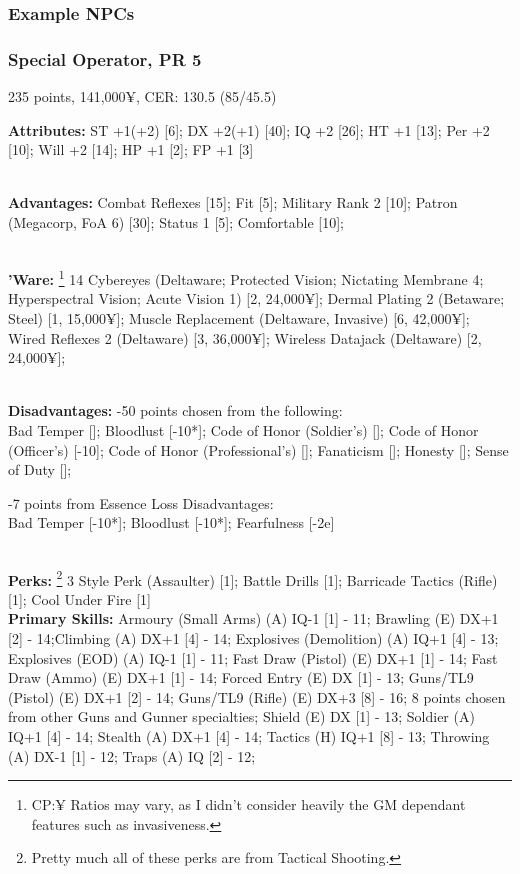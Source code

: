 \begin{multicols}{2}
	\subsubsection{Example NPCs}
	
	\subsubsection*{Special Operator, PR 5}
	\begin{flushright}
		235 points, 141,000¥, CER: 130.5 (85/45.5)
	\end{flushright}
	
	\textbf{Attributes: }
	ST +1(+2) [6]; DX +2(+1) [40]; IQ +2 [26]; HT +1 [13]; Per +2 [10]; Will +2 [14]; HP +1 [2]; FP +1 [3]
	
	\textbf{\\Advantages: }
	Combat Reflexes [15]; Fit [5]; Military Rank 2 [10]; Patron (Megacorp, FoA 6) [30]; Status 1 [5]; Comfortable [10];
	
	\textbf{\\'Ware: }\footnote{CP:¥ Ratios may vary, as I didn't consider heavily the GM dependant features such as invasiveness.} 14 %
	Cybereyes (Deltaware; Protected Vision; Nictating Membrane 4; Hyperspectral Vision; Acute Vision 1) [2, 24,000¥]; Dermal Plating 2 (Betaware; Steel) [1, 15,000¥]; Muscle Replacement (Deltaware, Invasive) [6, 42,000¥]; Wired Reflexes 2 (Deltaware) [3, 36,000¥]; Wireless Datajack (Deltaware) [2, 24,000¥];
	
	\textbf{\\Disadvantages: }
	-50 points chosen from the following:\\
	Bad Temper []; Bloodlust [-10*]; Code of Honor (Soldier's) []; Code of Honor (Officer's) [-10]; Code of Honor (Professional's) []; Fanaticism []; Honesty []; Sense of Duty [];
	
	-7 points from Essence Loss Disadvantages:\\
	Bad Temper [-10*]; Bloodlust [-10*]; Fearfulness [-2e]
	
	\textbf{\\Perks: }\footnote{Pretty much all of these perks are from Tactical Shooting.} 3 
	Style Perk (Assaulter) [1]; Battle Drills [1]; Barricade Tactics (Rifle) [1]; Cool Under Fire [1]\\
	
	\textbf{Primary Skills: }
	Armoury (Small Arms) (A) IQ-1 [1] - 11; Brawling (E) DX+1 [2] - 14;Climbing (A) DX+1 [4] - 14; Explosives (Demolition) (A) IQ+1 [4] - 13; Explosives (EOD) (A) IQ-1 [1] - 11; Fast Draw (Pistol) (E) DX+1 [1] - 14; Fast Draw (Ammo) (E) DX+1 [1] - 14; Forced Entry (E) DX [1] - 13; Guns/TL9 (Pistol) (E) DX+1 [2] - 14; Guns/TL9 (Rifle) (E) DX+3 [8] - 16; 8 points chosen from other Guns and Gunner specialties; Shield (E) DX [1] - 13; Soldier (A) IQ+1 [4] - 14; Stealth (A) DX+1 [4] - 14; Tactics (H) IQ+1 [8] - 13; Throwing (A) DX-1 [1] - 12; Traps (A) IQ [2] - 12; \\
	

\end{multicols}
